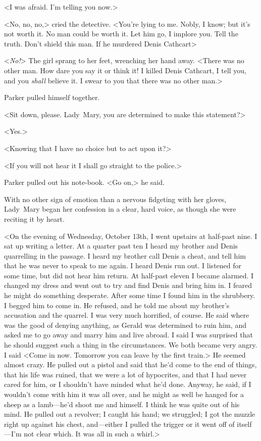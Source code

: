 <I was afraid. I'm telling you now.>

<No, no, no,> cried the detective. <You're lying to me. Nobly, I know; but it's not worth it. No man could be worth it. Let him go, I implore you. Tell the truth. Don't shield this man. If he murdered Denis Cathcart\longdash>

<\emph{No!}> The girl sprang to her feet, wrenching her hand away. <There was no other man. How dare you say it or think it! I killed Denis Cathcart, I tell you, and you \emph{shall} believe it. I swear to you that there was no other man.>

Parker pulled himself together.

<Sit down, please. Lady~Mary, you are determined to make this statement?>

<Yes.>

<Knowing that I have no choice but to act upon it?>

<If you will not hear it I shall go straight to the police.>

Parker pulled out his note-book. <Go on,> he said.

With no other sign of emotion than a nervous fidgeting with her gloves, Lady~Mary began her confession in a clear, hard voice, as though she were reciting it by heart.

<On the evening of Wednesday, October 13th, I went upstairs at half-past nine. I sat up writing a letter. At a quarter past ten I heard my brother and Denis quarrelling in the passage. I heard my brother call Denis a cheat, and tell him that he was never to speak to me again. I heard Denis run out. I listened for some time, but did not hear him return. At half-past eleven I became alarmed. I changed my dress and went out to try and find Denis and bring him in. I feared he might do something desperate. After some time I found him in the shrubbery. I begged him to come in. He refused, and he told me about my brother's accusation and the quarrel. I was very much horrified, of course. He said where was the good of denying anything, as Gerald was determined to ruin him, and asked me to go away and marry him and live abroad. I said I was surprised that he should suggest such a thing in the circumstances. We both became very angry. I said <Come in now.  Tomorrow you can leave by the first train.> He seemed almost crazy. He pulled out a pistol and said that he'd come to the end of things, that his life was ruined, that we were a lot of hypocrites, and that I had never cared for him, or I shouldn't have minded what he'd done. Anyway, he said, if I wouldn't come with him it was all over, and he might as well be hanged for a sheep as a lamb—he'd shoot me and himself. I think he was quite out of his mind. He pulled out a revolver; I caught his hand; we struggled; I got the muzzle right up against his chest, and—either I pulled the trigger or it went off of itself—I'm not clear which. It was all in such a whirl.>

